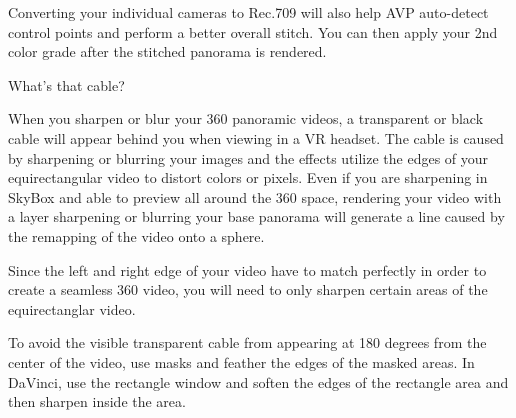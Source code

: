\begin{fullwidth}
Converting your individual cameras to Rec.709 will also help AVP auto-detect control points and perform a better overall stitch. You can then apply your 2nd color grade after the stitched panorama is rendered.

{\large What's that cable? \par}

When you sharpen or blur your 360 panoramic videos, a transparent or black cable will appear behind you when viewing in a VR headset. The cable is caused by sharpening or blurring your images and the effects utilize the edges of your equirectangular video to distort colors or pixels. Even if you are sharpening in SkyBox and able to preview all around the 360 space, rendering your video with a layer sharpening or blurring your base panorama will generate a line caused by the remapping of the video onto a sphere.


Since the left and right edge of your video have to match perfectly in order to create a seamless 360 video, you will need to only sharpen certain areas of the equirectanglar video.

To avoid the visible transparent cable from appearing at 180 degrees from the center of the video, use masks and feather the edges of the masked areas. In DaVinci, use the rectangle window and soften the edges of the rectangle area and then sharpen inside the area.



\end{fullwidth}